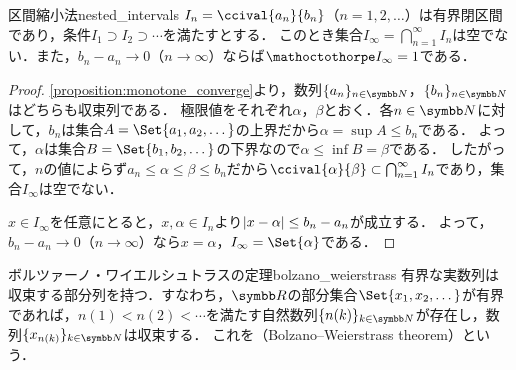 \documentclass[../../main]{subfiles}
\begin{document}
\begin{proposition}{区間縮小法}{nested_intervals}
  \(I_n=\ccival{a_n}{b_n}\)（\(n=1,2,\dotsc\)）は有界閉区間であり，条件\(I_1\supset I_2\supset\dotsb\)を満たすとする．
  このとき集合\(I_\infty=\bigcap_{n=1}^\infty I_n\)は空でない．また，\(b_n-a_n\to 0\)（\(n\to\infty\)）ならば\(\sizeof{I_\infty}=1\)である．
\end{proposition}

\begin{proof}
  \cref{proposition:monotone_converge}より，数列\(\seq{a_n}_{n\in\numset{N}}\)，\(\seq{b_n}_{n\in\numset{N}}\)はどちらも収束列である．
  極限値をそれぞれ\(\alpha\)，\(\beta\)とおく．各\(n\in\numset{N}\)に対して，\(b_n\)は集合\(A=\Set{a_1,a_2,\dotsc}\)の上界だから\(\alpha=\sup A\leq b_n\)である．
  よって，\(\alpha\)は集合\(B=\Set{b_1,b_2,\dotsc}\)の下界なので\(\alpha\leq\inf B=\beta\)である．
  したがって，\(n\)の値によらず\(a_n\leq\alpha\leq\beta\leq b_n\)だから\(\ccival{\alpha}{\beta}\subset\bigcap_{n=1}^\infty I_n\)であり，集合\(I_\infty\)は空でない．

  \(x\in I_\infty\)を任意にとると，\(x,\alpha\in I_n\)より\(\lvert x-\alpha\rvert\leq b_n-a_n\)が成立する．
  よって，\(b_n-a_n\to 0\)（\(n\to\infty\)）なら\(x=\alpha\)，\(I_\infty=\Set{\alpha}\)である．
\end{proof}

\begin{theorem}{ボルツァーノ・ワイエルシュトラスの定理}{bolzano_weierstrass}
  有界な実数列は収束する部分列を持つ．すなわち，\(\numset{R}\)の部分集合\(\Set{x_1,x_2,\dotsc}\)が有界であれば，\(n(1)<n(2)<\dotsb\)を満たす自然数列\(\seq{n(k)}_{k\in\numset{N}}\)が存在し，数列\(\seq{x_{n(k)}}_{k\in\numset{N}}\)は収束する．
  これを（Bolzano–Weierstrass theorem）という．
\end{theorem}
\end{document}
